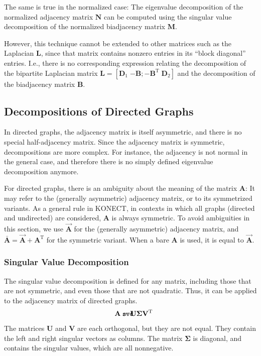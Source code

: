 \documentclass{article}
\def\mathnote#1{%
  \tag*{\rlap{\hspace\marginparsep\smash{\parbox[t]{\marginparwidth}{#1}}}}
}
\begin{document}
The same is true in the normalized case:  The eigenvalue decomposition
of the normalized adjacency matrix $\mathbf N$ can be computed using the
singular value decomposition of the normalized biadjacency matrix
$\mathbf M$. 

However, this technique cannot be extended to other matrices such as the Laplacian
$\mathbf L$, since that matrix contains nonzero entries in its
``block diagonal'' entries. 
I.e., there is no corresponding expression relating the decomposition
of the bipartite Laplacian matrix $\mathbf L = [\mathbf D_1 \; {-\mathbf B}; -\mathbf
  B^{\mathrm T} \; \mathbf D_2]$ and the decomposition of the biadjacency
matrix $\mathbf B$. 

\subsection{Decompositions of Directed Graphs}
In directed graphs, the adjacency matrix is itself
asymmetric, and there is no special half-adjacency matrix.  Since the
adjacency matrix is symmetric, decompositions are more complex.  For
instance, the adjacency is not normal in the general case, and therefore
there is no simply defined eigenvalue decomposition anymore. 

For directed graphs, there is an ambiguity about the meaning of the
matrix $\mathbf A$:  It may refer to the (generally asymmetric)
adjacency matrix, or to its symmetrized variants.  As a general rule in
KONECT, in contexts in which all graphs (directed and undirected) are
considered, $\mathbf A$ is always symmetric.  To avoid ambiguities in
this section, we use $\vec{\mathbf A}$ for the (generally asymmetric)
adjacency matrix, and $\mathbf{\bar A}=\vec{\mathbf A}+\mathbf
A^{\mathrm T}$ for the symmetric variant.  When a bare $\mathbf A$ is
used, it is equal to $\vec{\mathbf A}$. 

\subsubsection{Singular Value Decomposition}
\label{sec:matrix.svd}
The singular value decomposition is defined for any matrix, including
those that are not symmetric, and even those that are not quadratic.
Thus, it can be applied to the adjacency matrix of directed graphs. 
\begin{align}
  \mathnote{\texttt{svd}}
  \mathbf A &= \mathbf U \mathbf \Sigma \mathbf V^{\mathrm T}
\end{align}
The matrices $\mathbf U$ and $\mathbf V$ are each orthogonal, but they
are not equal.  They contain the left and right singular vectors as
columns.  The matrix $\mathbf \Sigma$ is diagonal, and contains the
singular values, which are all nonnegative. 
\end{document}
